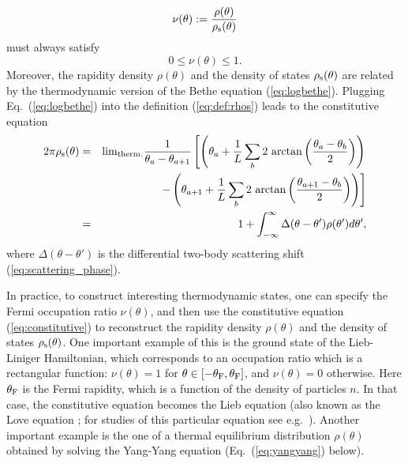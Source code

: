 \documentclass[onecolumn,amsfonts,showpacs,superscriptaddress]{revtex4-1}
\begin{document}
\begin{equation}
    \nu (\theta) := \frac{\rho(\theta)}{\rho_{\rm s}(\theta)}
\end{equation}
must always satisfy
\begin{equation}
    0 \leq \nu (\theta) \leq 1 .
\end{equation}
Moreover, the rapidity density $\rho(\theta)$ and the density of states $\rho_{\rm s}(\theta)$ are related by the thermodynamic version of the Bethe equation (\ref{eq:logbethe}). Plugging Eq.~(\ref{eq:logbethe}) into the definition (\ref{eq:def:rhos}) leads to the constitutive equation
\begin{eqnarray}
    \label{eq:constitutive}
 \nonumber   2\pi \rho_{\rm s}(\theta) &=&  {\rm lim}_{\rm therm.}  \frac{1}{\theta_a- \theta_{a+1}} \left[
    \left( \theta_a + \frac{1}{L} \sum_{b} 2 \, \arctan \left( \frac{\theta_a - \theta_b}{2} \right) \right) \right. \\
\nonumber   && \left. \qquad \qquad \quad - \left( \theta_{a+1} + \frac{1}{L} \sum_{b} 2 \, \arctan \left( \frac{\theta_{a+1} - \theta_b}{2} \right) \right) \right] \\
    &=& 1 +\int_{-\infty}^\infty \Delta(\theta - \theta') \rho(\theta') d\theta' ,
\end{eqnarray}
where $\Delta(\theta - \theta')$ is the differential two-body scattering shift (\ref{eq:scattering_phase}).


In practice, to construct interesting thermodynamic states, one can specify the Fermi occupation ratio $\nu(\theta)$, and then use the constitutive equation (\ref{eq:constitutive}) to reconstruct the rapidity density $\rho(\theta)$ and the density of states $\rho_{\rm s}(\theta)$. One important example of this is the ground state of the Lieb-Liniger Hamiltonian, which corresponds to an occupation ratio which is a rectangular function: $\nu(\theta) = 1$ for $\theta \in [-\theta_{\rm F} , \theta_{\rm F}]$, and $\nu(\theta) = 0$ otherwise. Here $\theta_{\rm F}$ is the Fermi rapidity, which is a function of the density of particles $n$. In that case, the constitutive equation becomes the Lieb equation \citep{lieb1963exact} (also known as the Love equation \citep{love1949electrostatic}; for studies of this particular equation see e.g.~\cite{takahashi1975validity,popov1977theory,lang2017ground,prolhac2017ground,marino2019exact}). Another important example is the one of a thermal equilibrium distribution $\rho(\theta)$ obtained by solving the Yang-Yang equation (Eq.~(\ref{eq:yangyang}) below).
\end{document}
